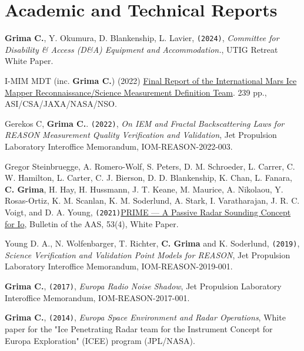 \section*{Academic and Technical Reports}

\begin{etaremune}
\def\labelenumi{\arabic{enumi}.}

\item
   \textbf{Grima C.}, Y. Okumura, D. Blankenship, L. Lavier, \texttt{(2024)}, \emph{Committee for Disability \& Access (D\&A) Equipment and Accommodation.}, UTIG Retreat White Paper.
   
\item 
   I-MIM MDT (inc. \textbf{Grima C.}) (2022) \href{https://smd-cms.nasa.gov/wp-content/uploads/2023/10/i-mim-mdt-final-report-31-aug-2022-final-hi-qual-copy-tagged.pdf}{Final Report of the International Mars Ice Mapper Reconnaissance/Science Measurement Definition Team}. 239 pp., ASI/CSA/JAXA/NASA/NSO.
   
\item
   Gerekos C, \textbf{Grima C.}. \texttt{(2022)}, \emph{On IEM and Fractal Backscattering Laws for REASON Measurement Quality Verification and Validation}, Jet Propulsion Laboratory Interoffice Memorandum, IOM-REASON-2022-003.

\item
   Gregor Steinbruegge, A. Romero-Wolf, S. Peters, D. M. Schroeder, L. Carrer, C. W. Hamilton, L. Carter, C. J. Bierson, D. D. Blankenship, K. Chan, L. Fanara, \textbf{C. Grima}, H. Hay, H. Hussmann, J. T. Keane, M. Maurice, A. Nikolaou, Y. Rosas-Ortiz, K. M. Scanlan, K. M. Soderlund, A. Stark, I. Varatharajan, J. R. C. Voigt, and D. A. Young, \texttt{(2021)}\href{https://baas.aas.org/pub/2021n4i271/release/1}{PRIME — A Passive Radar Sounding Concept for Io}, Bulletin of the AAS, 53(4), White Paper.
   
\item
   Young D. A., N. Wolfenbarger, T. Richter, \textbf{C. Grima} and K. Soderlund, \texttt{(2019)}, \emph{Science Verification and Validation Point Models for REASON}, Jet Propulsion Laboratory Interoffice Memorandum, IOM-REASON-2019-001.
   
\item
  \textbf{Grima C.}, \texttt{(2017)}, \emph{Europa Radio Noise Shadow},
  Jet Propulsion Laboratory Interoffice Memorandum, IOM-REASON-2017-001.
  
\item
  \textbf{Grima C.}, \texttt{(2014)}, \emph{Europa Space Environment and
  Radar Operations}, White paper for the "Ice Penetrating Radar team for
  the Instrument Concept for Europa Exploration" (ICEE) program
  (JPL/NASA).
  

\end{etaremune}
